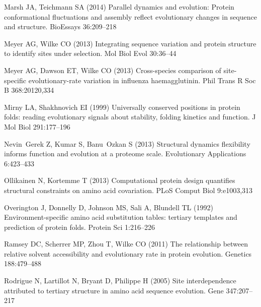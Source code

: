 \documentclass[smallextended]{svjour3}
\begin{document}
\begin{thebibliography}{55}
Marsh JA, Teichmann SA (2014) Parallel dynamics and evolution: {Protein}
  conformational fluctuations and assembly reflect evolutionary changes in
  sequence and structure. {BioEssays} 36:209--218

Meyer AG, Wilke CO (2013) Integrating sequence variation and protein structure
  to identify sites under selection. Mol Biol Evol 30:36--44

Meyer AG, Dawson ET, Wilke CO (2013) Cross-species comparison of site-specific
  evolutionary-rate variation in influenza haemagglutinin. Phil Trans R Soc B
  368:20120,334

Mirny LA, Shakhnovich EI (1999) Universally conserved positions in protein
  folds: reading evolutionary signals about stability, folding kinetics and
  function. J Mol Biol 291:177--196

Nevin~Gerek Z, Kumar S, Banu~Ozkan S (2013) Structural dynamics flexibility
  informs function and evolution at a proteome scale. Evolutionary Applications
  6:423--433

Ollikainen N, Kortemme T (2013) Computational protein design quantifies
  structural constraints on amino acid covariation. PLoS Comput Biol
  9:e1003,313

Overington J, Donnelly D, Johnson MS, Sali A, Blundell TL (1992)
  Environment-specific amino acid substitution tables: tertiary templates and
  prediction of protein folds. Protein Sci 1:216--226

Ramsey DC, Scherrer MP, Zhou T, Wilke CO (2011) The relationship between
  relative solvent accessibility and evolutionary rate in protein evolution.
  Genetics 188:479--488

Rodrigue N, Lartillot N, Bryant D, Philippe H (2005) Site interdependence
  attributed to tertiary structure in amino acid sequence evolution. Gene
  347:207--217


\end{thebibliography}
\end{document}
